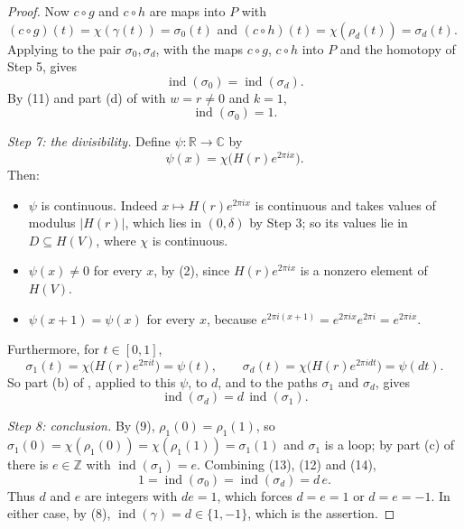 \begin{proof}
Now $c\circ g$ and $c\circ h$ are maps into $P$ with
$(c\circ g)(t)=\chi(\gamma(t))=\sigma_0(t)$ and
$(c\circ h)(t)=\chi(\rho_d(t))=\sigma_d(t)$.  Applying
 to the pair $\sigma_0,\sigma_d$, with the
maps $c\circ g$, $c\circ h$ into $P$ and the homotopy of Step 5, gives
\begin{equation}\tag{12}
  \operatorname{ind}(\sigma_0)=\operatorname{ind}(\sigma_d).
\end{equation}
By (11) and part (d) of  with $w=r\neq0$ and $k=1$,
\begin{equation}\tag{13}
  \operatorname{ind}(\sigma_0)=1 .
\end{equation}

\emph{Step 7: the divisibility.}  Define $\psi\colon\mathbb{R}\to\mathbb{C}$ by
\[
  \psi(x)=\chi\bigl(H(r)e^{2\pi ix}\bigr).
\]
Then:
\begin{itemize}
\item $\psi$ is continuous.  Indeed $x\mapsto H(r)e^{2\pi ix}$ is continuous and
takes values of modulus $|H(r)|$, which lies in $(0,\delta)$ by Step 3; so its
values lie in $D\subseteq H(V)$, where $\chi$ is continuous.
\item $\psi(x)\neq0$ for every $x$, by (2), since $H(r)e^{2\pi ix}$ is a nonzero
element of $H(V)$.
\item $\psi(x+1)=\psi(x)$ for every $x$, because
$e^{2\pi i(x+1)}=e^{2\pi ix}e^{2\pi i}=e^{2\pi ix}$.
\end{itemize}
Furthermore, for $t\in[0,1]$,
\[
  \sigma_1(t)=\chi\bigl(H(r)e^{2\pi it}\bigr)=\psi(t),
  \qquad
  \sigma_d(t)=\chi\bigl(H(r)e^{2\pi idt}\bigr)=\psi(dt).
\]
So part (b) of , applied to this $\psi$, to $d$, and
to the paths $\sigma_1$ and $\sigma_d$, gives
\begin{equation}\tag{14}
  \operatorname{ind}(\sigma_d)=d\,\operatorname{ind}(\sigma_1).
\end{equation}

\emph{Step 8: conclusion.}  By (9), $\rho_1(0)=\rho_1(1)$, so
$\sigma_1(0)=\chi(\rho_1(0))=\chi(\rho_1(1))=\sigma_1(1)$ and $\sigma_1$ is a
loop; by part (c) of  there is $e\in\mathbb{Z}$ with
$\operatorname{ind}(\sigma_1)=e$.  Combining (13), (12) and (14),
\[
  1=\operatorname{ind}(\sigma_0)=\operatorname{ind}(\sigma_d)=d\,e .
\]
Thus $d$ and $e$ are integers with $de=1$, which forces $d=e=1$ or
$d=e=-1$.  In either case, by (8),
$\operatorname{ind}(\gamma)=d\in\{1,-1\}$, which is the assertion.
\end{proof}
